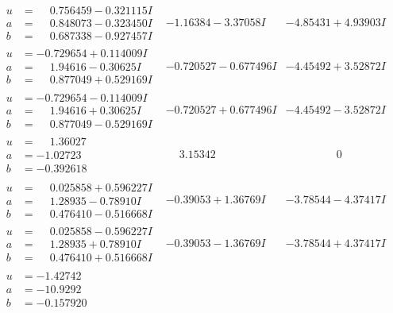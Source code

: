 \documentclass[1p]{elsarticle_modified}
\theoremstyle{definition}
\begin{document}
$$\begin{array}{c|c|c}
\begin{aligned}
u &= \phantom{-}0.756459 - 0.321115 I \\
a &= \phantom{-}0.848073 - 0.323450 I \\
b &= \phantom{-}0.687338 - 0.927457 I\end{aligned}
 & -1.16384 - 3.37058 I & -4.85431 + 4.93903 I \\ \hline\begin{aligned}
u &= -0.729654 + 0.114009 I \\
a &= \phantom{-}1.94616 - 0.30625 I \\
b &= \phantom{-}0.877049 + 0.529169 I\end{aligned}
 & -0.720527 - 0.677496 I & -4.45492 + 3.52872 I \\ \hline\begin{aligned}
u &= -0.729654 - 0.114009 I \\
a &= \phantom{-}1.94616 + 0.30625 I \\
b &= \phantom{-}0.877049 - 0.529169 I\end{aligned}
 & -0.720527 + 0.677496 I & -4.45492 - 3.52872 I \\ \hline\begin{aligned}
u &= \phantom{-}1.36027\phantom{ +0.000000I} \\
a &= -1.02723\phantom{ +0.000000I} \\
b &= -0.392618\phantom{ +0.000000I}\end{aligned}
 & \phantom{-}3.15342\phantom{ +0.000000I} & \phantom{-0.000000 } 0 \\ \hline\begin{aligned}
u &= \phantom{-}0.025858 + 0.596227 I \\
a &= \phantom{-}1.28935 - 0.78910 I \\
b &= \phantom{-}0.476410 - 0.516668 I\end{aligned}
 & -0.39053 + 1.36769 I & -3.78544 - 4.37417 I \\ \hline\begin{aligned}
u &= \phantom{-}0.025858 - 0.596227 I \\
a &= \phantom{-}1.28935 + 0.78910 I \\
b &= \phantom{-}0.476410 + 0.516668 I\end{aligned}
 & -0.39053 - 1.36769 I & -3.78544 + 4.37417 I \\ \hline\begin{aligned}
u &= -1.42742\phantom{ +0.000000I} \\
a &= -10.9292\phantom{ +0.000000I} \\
b &= -0.157920\phantom{ +0.000000I}\end{aligned}

\end{array}$$
\end{document}
